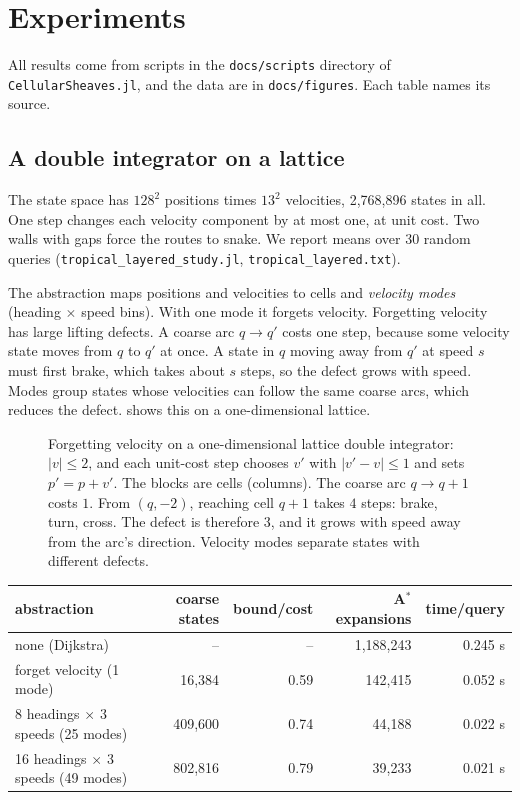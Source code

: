 \documentclass[11pt]{article}
\theoremstyle{definition}
\theoremstyle{remark}
\begin{document}
\section{Experiments}\label{sec:experiments}

All results come from scripts in the \texttt{docs/scripts} directory of
\texttt{CellularSheaves.jl}, and the data are in \texttt{docs/figures}. Each table names its source.

\subsection{A double integrator on a lattice}
The state space has $128^2$ positions times $13^2$ velocities, 2{,}768{,}896 states
in all. One step changes each velocity component by at most one, at unit cost.
Two walls with gaps force the routes to snake. We report means over 30 random
queries (\texttt{tropical\_layered\_study.jl}, \texttt{tropical\_layered.txt}).

The abstraction maps positions and velocities to cells and \emph{velocity modes}
(heading $\times$ speed bins). With one mode it forgets velocity. Forgetting
velocity has large lifting defects. A coarse arc $q \to q'$ costs one step,
because some velocity state moves from $q$ to $q'$ at once. A state in $q$ moving
away from $q'$ at speed $s$ must first brake, which takes about $s$ steps, so the
defect grows with speed. Modes group states whose velocities can follow the same
coarse arcs, which reduces the defect.
 shows this on a one-dimensional lattice.

\begin{figure}[t]
\centering

\caption{Forgetting velocity on a one-dimensional lattice double integrator:
$|v| \le 2$, and each unit-cost step chooses $v'$ with $|v' - v| \le 1$ and sets
$p' = p + v'$. The blocks are cells (columns). The coarse arc $q \to q+1$ costs
$1$. From $(q,-2)$, reaching cell $q+1$ takes $4$ steps: brake, turn, cross. The
defect is therefore $3$, and it grows with speed away from the arc's direction.
Velocity modes separate states with different defects.}
\label{fig:velocity}
\end{figure}

\begin{center}
\begin{tabular}{lrrrr}
\toprule
abstraction & coarse states & bound/cost & A$^*$ expansions & time/query \\
\midrule
none (Dijkstra) & -- & -- & 1{,}188{,}243 & 0.245 s \\
forget velocity (1 mode) & 16{,}384 & 0.59 & 142{,}415 & 0.052 s \\
8 headings $\times$ 3 speeds (25 modes) & 409{,}600 & 0.74 & 44{,}188 & 0.022 s \\
16 headings $\times$ 3 speeds (49 modes) & 802{,}816 & 0.79 & 39{,}233 & 0.021 s \\
\bottomrule
\end{tabular}
\end{center}
\end{document}
